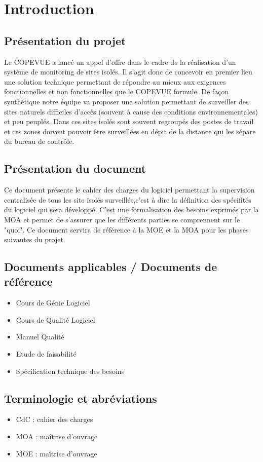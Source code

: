 \section{Introduction}
\subsection{Présentation du projet}
Le COPEVUE a lancé un appel d'offre dans le cadre de la réalisation d'un système de monitoring de sites isolés. Il s'agit donc de concevoir en premier lieu une solution technique permettant de répondre au mieux aux exigences fonctionnelles et non fonctionnelles que le COPEVUE formule. De façon synthétique notre équipe va proposer une solution permettant de surveiller des sites naturels difficiles d'accès (souvent à cause des conditions environnementales) et peu peuplés. Dans ces sites isolés sont souvent regroupés des postes de travail et ces zones doivent pouvoir être surveillées en dépit de la distance qui les sépare du bureau de contrôle.

\subsection{Présentation du document}
Ce document présente le cahier des charges du logiciel permettant la supervision centralisée de tous les site isolés surveillés,c'est à dire la définition des spécifités du logiciel qui sera développé. C'est une formalisation des besoins exprimés par la MOA et permet de s'assurer que les différents parties se comprennent sur le "quoi". Ce document servira de référence à la MOE et la MOA pour les phases suivantes du projet.

\subsection{Documents applicables / Documents de référence}
\begin{itemize}
	\item Cours de Génie Logiciel
	\item Cours de Qualité Logiciel
	\item Manuel Qualité 
	\item Etude de faisabilité
	\item Spécification technique des besoins
\end{itemize}

\subsection{Terminologie et abréviations}
\begin{itemize}
	\item CdC : cahier des charges
	\item MOA : maîtrise d'ouvrage
	\item MOE : maîtrise d'ouvrage
\end{itemize}

